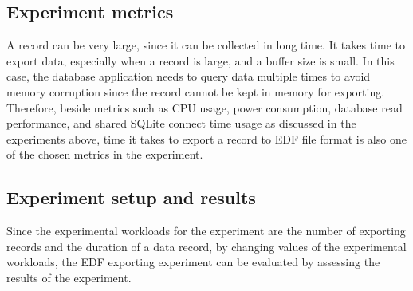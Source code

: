 \subsection{Experiment metrics}
A record can be very large, since it can be collected in long time. It takes time to export data, especially when a record is large, and a buffer size is small. In this case, the database application needs to query data multiple times to avoid memory corruption since the record cannot be kept in memory for exporting. Therefore, beside metrics such as CPU usage, power consumption, database read performance, and shared SQLite connect time usage as discussed in the experiments above, time it takes to export a record to EDF file format is also one of the chosen metrics in the experiment.
\subsection{Experiment setup and results}
Since the experimental workloads for the experiment are the number of exporting records and the duration of a data record, by changing values of the experimental workloads, the EDF exporting experiment can be evaluated by assessing the results of the experiment.\\
